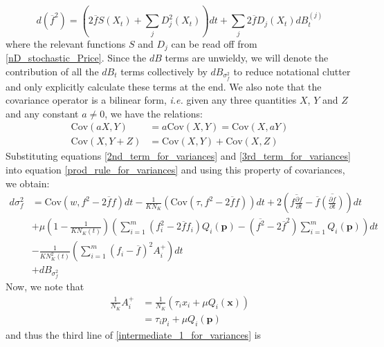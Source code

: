 \begin{equation}
\label{3rd_term_for_variances}
d(\overline{f}^2) = \left(2\overline{f}S(X_t) + \sum\limits_{j}D_j^2(X_t)\right)dt + \sum\limits_{j}2\overline{f}D_j(X_t)dB^{(j)}_t
\end{equation}
where the relevant functions $S$ and $D_j$ can be read off from \eqref{nD_stochastic_Price}. Since the $dB$ terms are unwieldy, we will denote the contribution of all the $dB_t$ terms collectively by $dB_{\sigma^2_{f}}$ to reduce notational clutter and only explicitly calculate these terms at the end. We also note that the covariance operator is a bilinear form, \emph{i.e.} given any three quantities $X$, $Y$ and $Z$ and any constant $a \neq 0$, we have the relations:
\begin{align*}
\textrm{Cov}(aX,Y) &= a\textrm{Cov}(X,Y) = \textrm{Cov}(X,aY)\\
\textrm{Cov}(X,Y+Z) &= \textrm{Cov}(X,Y)+\textrm{Cov}(X,Z)
\end{align*}
Substituting equations \eqref{2nd_term_for_variances} and \eqref{3rd_term_for_variances} into equation \eqref{prod_rule_for_variances} and using this property of covariances, we obtain:
\begin{equation}
\label{intermediate_1_for_variances}
\begin{aligned}
d\sigma^2_{f} &= \textrm{Cov}(w,f^2 - 2\overline{f}f)dt - \frac{1}{KN_K}\left(\textrm{Cov}(\tau,f^2 - 2\overline{f}f)\right)dt + 2\left(\overline{f\frac{\partial f}{\partial t}} - \overline{f}\overline{\left(\frac{\partial f}{\partial t}\right)}\right)dt\\
&+ \mu\left(1-\frac{1}{KN_K(t)}\right)\left(\sum\limits_{i=1}^{m}(f^2_i - 2\overline{f}f_i)Q_i(\mathbf{p}) - (\overline{f^2}-2\overline{f}^2)\sum\limits_{i=1}^{m}Q_i(\mathbf{p})\right)dt\\
&- \frac{1}{KN^2_{K}(t)}\left(\sum\limits_{i=1}^{m}(f_i - \overline{f})^2A_i^+\right)dt\\
&+ dB_{\sigma^2_{f}}
\end{aligned}
\end{equation}
Now, we note that
\begin{align}
\frac{1}{N_K}A_i^+ &= \frac{1}{N_K}\left(\tau_ix_i + \mu Q_i(\mathbf{x})\right)\\
&= \tau_ip_i + \mu Q_i(\mathbf{p})
\end{align}
and thus the third line of \eqref{intermediate_1_for_variances} is
